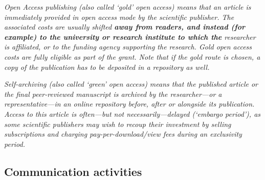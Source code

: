 {\textit{Open Access publishing (also called `gold' open access) means that an
article is immediately provided in open access mode by the scientific publisher.
The associated costs are usually shifted \textbf{away from readers, and instead
(for example) to the university or research institute to which the} researcher
is affiliated, or to the funding agency supporting the research. Gold open
access costs are fully eligible as part of the grant. Note that if the gold
route is chosen, a copy of the publication has to be deposited in a repository
as well.}

\textit{Self-archiving (also called `green' open access) means that the
published article or the final peer-reviewed manuscript is archived by the
researcher---or a representative---in an online repository before, after or
alongside its publication. Access to this article is often---but not
necessarily---delayed (`embargo period'), as some scientific publishers may wish
to recoup their investment by selling subscriptions and charging
pay-per-download/view fees during an exclusivity period. } }

\lipsum[1]


\subsection[Communication activities]{Communication
activities}
\label{sec:communication}


\lipsum[1]

